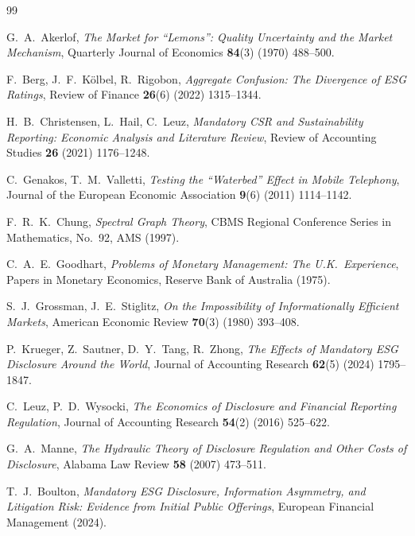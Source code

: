 \documentclass[12pt,a4paper]{article}
\begin{document}
\begin{thebibliography}{99}

G.~A.~Akerlof,
\textit{The Market for ``Lemons'': Quality Uncertainty and the Market Mechanism},
Quarterly Journal of Economics \textbf{84}(3) (1970) 488--500.

F.~Berg, J.~F.~K\"olbel, R.~Rigobon,
\textit{Aggregate Confusion: The Divergence of ESG Ratings},
Review of Finance \textbf{26}(6) (2022) 1315--1344.

H.~B.~Christensen, L.~Hail, C.~Leuz,
\textit{Mandatory CSR and Sustainability Reporting: Economic Analysis and Literature Review},
Review of Accounting Studies \textbf{26} (2021) 1176--1248.

C.~Genakos, T.~M.~Valletti,
\textit{Testing the ``Waterbed'' Effect in Mobile Telephony},
Journal of the European Economic Association \textbf{9}(6) (2011) 1114--1142.

F.~R.~K.~Chung,
\textit{Spectral Graph Theory},
CBMS Regional Conference Series in Mathematics, No.~92, AMS (1997).

C.~A.~E.~Goodhart,
\textit{Problems of Monetary Management: The U.K.\ Experience},
Papers in Monetary Economics, Reserve Bank of Australia (1975).

S.~J.~Grossman, J.~E.~Stiglitz,
\textit{On the Impossibility of Informationally Efficient Markets},
American Economic Review \textbf{70}(3) (1980) 393--408.

P.~Krueger, Z.~Sautner, D.~Y.~Tang, R.~Zhong,
\textit{The Effects of Mandatory ESG Disclosure Around the World},
Journal of Accounting Research \textbf{62}(5) (2024) 1795--1847.

C.~Leuz, P.~D.~Wysocki,
\textit{The Economics of Disclosure and Financial Reporting Regulation},
Journal of Accounting Research \textbf{54}(2) (2016) 525--622.

G.~A.~Manne,
\textit{The Hydraulic Theory of Disclosure Regulation and Other Costs of Disclosure},
Alabama Law Review \textbf{58} (2007) 473--511.

T.~J.~Boulton,
\textit{Mandatory ESG Disclosure, Information Asymmetry, and Litigation Risk: Evidence from Initial Public Offerings},
European Financial Management (2024).


\end{thebibliography}
\end{document}
